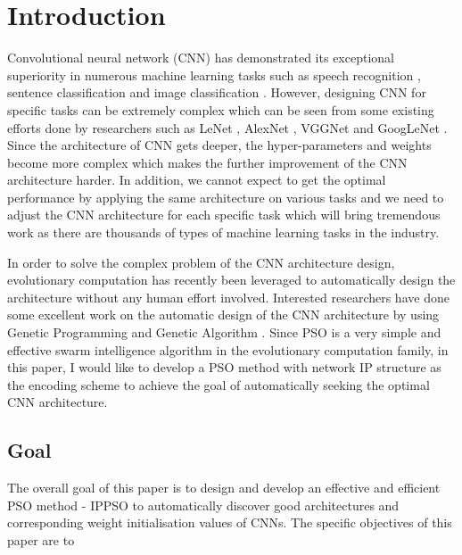 \documentclass[conference]{IEEEtran}
\begin{document}
\section{Introduction}
Convolutional neural network (CNN) has demonstrated its exceptional superiority in numerous machine learning tasks such as speech recognition \cite{CNNspeech:Ossama}, sentence classification \cite{CNNsentence:Yoon} and image classification \cite{ImageNet:Alex}. However, designing CNN for specific tasks can be extremely complex which can be seen from some existing efforts done by researchers such as LeNet \cite{ZipcodeRecognition:LeCun}\cite{DocumentRecognition:LeCun}, AlexNet \cite{ImageNet:Alex}, VGGNet \cite{CNNverydeep:Simonyan} and GoogLeNet \cite{CNNdeeper:Szegedy}. Since the architecture of CNN gets deeper, the hyper-parameters and weights become more complex which makes the further improvement of the CNN architecture harder. In addition, we cannot expect to get the optimal performance by applying the same architecture on various tasks and we need to adjust the CNN architecture for each specific task which will bring tremendous work as there are thousands of types of machine learning tasks in the industry. 


In order to solve the complex problem of the CNN architecture design, evolutionary computation has recently been leveraged to automatically design the architecture without any human effort involved. Interested researchers have done some excellent work on the automatic design of the CNN architecture by using Genetic Programming \cite{CNNGP:Suganuma} and Genetic Algorithm \cite{CNNevolve:Stanley}. Since PSO is a very simple and effective swarm intelligence algorithm in the evolutionary computation family, in this paper, I would like to develop a PSO method with network IP structure as the encoding scheme to achieve the goal of automatically seeking the optimal CNN architecture. 



\subsection{Goal}
The overall goal of this paper is to design and develop an effective and efficient PSO method - IPPSO to automatically discover good architectures and corresponding weight initialisation values of CNNs. The specific objectives of this paper are to
\end{document}
